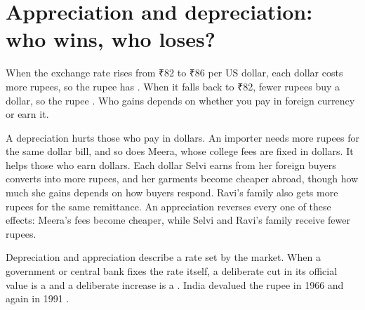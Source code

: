 \section{Appreciation and depreciation: who wins, who loses?}\label{sec:appdep}

When the exchange rate rises from ₹82 to ₹86 per US dollar, each dollar costs more rupees, so the rupee has . When it falls back to ₹82, fewer rupees buy a dollar, so the rupee . Who gains depends on whether you pay in foreign currency or earn it.

A depreciation hurts those who pay in dollars. An importer needs more rupees for the same dollar bill, and so does Meera, whose college fees are fixed in dollars. It helps those who earn dollars. Each dollar Selvi earns from her foreign buyers converts into more rupees, and her garments become cheaper abroad, though how much she gains depends on how buyers respond. Ravi's family also gets more rupees for the same remittance. An appreciation reverses every one of these effects: Meera's fees become cheaper, while Selvi and Ravi's family receive fewer rupees.

Depreciation and appreciation describe a rate set by the market. When a government or central bank fixes the rate itself, a deliberate cut in its official value is a  and a deliberate increase is a . India devalued the rupee in 1966 and again in 1991 .
